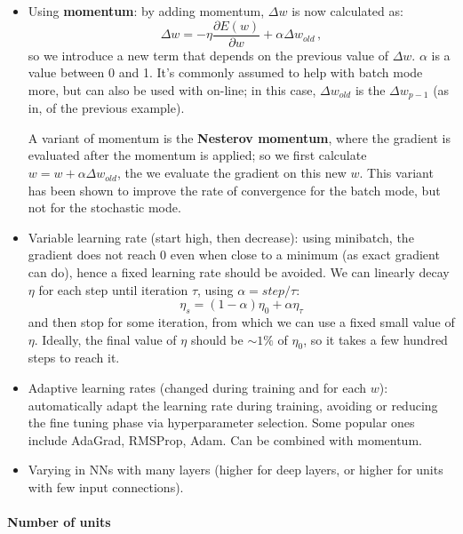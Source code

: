 \begin{itemize}
    \item Using \textbf{momentum}: by adding momentum, $\Delta w$ is now calculated as:
    \begin{equation*}
        \Delta w = - \eta \dfrac{\partial E(w)}{\partial w} + \alpha \Delta w_{old} \, ,
    \end{equation*}
    so we introduce a new term that depends on the previous value of $\Delta w$. $\alpha$ is a value between 0 and 1. It's commonly assumed to help with batch mode more, but can also be used with on-line; in this case, $\Delta w_{old}$ is the $\Delta w_{p-1}$ (as in, of the previous example).

    A variant of momentum is the \textbf{Nesterov momentum}, where the gradient is evaluated after the momentum is applied; so we first calculate $w = w + \alpha \Delta w_{old}$, the we evaluate the gradient on this new $w$. This variant has been shown to improve the rate of convergence for the batch mode, but not for the stochastic mode.
    
    \item Variable learning rate (start high, then decrease):
    using minibatch, the gradient does not reach 0 even when close to a minimum (as exact gradient can do), hence a fixed learning rate should be avoided. We can linearly decay $\eta$ for each step until iteration $\tau$, using $\alpha = step / \tau$:
    \begin{equation*}
        \eta_s = (1-\alpha)\eta_0 + \alpha \eta_{\tau} 
    \end{equation*}
    and then stop for some iteration, from which we can use a fixed small value of $\eta$. Ideally, the final value of $\eta$ should be $\sim 1\%$ of $\eta_0$, so it takes a few hundred steps to reach it.
    
    \item Adaptive learning rates (changed during training and for each $w$): automatically adapt the learning rate during training, avoiding or reducing the fine tuning phase via hyperparameter selection. Some popular ones include AdaGrad, RMSProp, Adam. Can be combined with momentum.
    
    \item Varying in NNs with many layers (higher for deep layers, or higher for units with few input connections).
\end{itemize}

\paragraph{Number of units}

